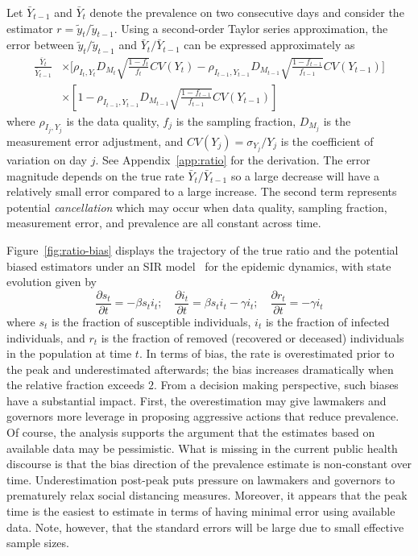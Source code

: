 \documentclass[12pt]{amsart}
\numberwithin{equation}{section}
\theoremstyle{plain}
\begin{document}
Let $\bar Y_{t-1}$ and $\bar Y_{t}$ denote the prevalence on two consecutive days and consider the estimator $r = \tilde y_t / \tilde y_{t-1}$.  Using a second-order Taylor series approximation, the error between ${\tilde y_t}/{\tilde y_{t-1}}$ and ${\bar Y_{t}}/{\bar Y_{t-1}}$ can be expressed approximately as
$$
\begin{aligned}
\frac{\bar Y_t}{\bar Y_{t-1}} &\times \bigg[ \rho_{I_t,Y_t} D_{M_t} \sqrt{\frac{1-f_t}{f_t}} CV (Y_t)  -\rho_{I_{t-1},Y_{t-1}} D_{M_{t-1}} \sqrt{\frac{1-f_{t-1}}{f_{t-1}}} CV (Y_{t-1}) \bigg] \\
&\times \left[ 1 - \rho_{I_{t-1},Y_{t-1}} D_{M_{t-1}} \sqrt{\frac{1-f_{t-1}}{f_{t-1}}} CV (Y_{t-1}) \right]
\end{aligned}
$$
where $\rho_{I_j, Y_j}$ is the data quality, $f_j$ is the sampling fraction, $D_{M_j}$ is the measurement error adjustment, and $CV(Y_j) = \sigma_{Y_j}/Y_j$ is the coefficient of variation on day $j$.  See Appendix~\ref{app:ratio} for the derivation. The error magnitude depends on the true rate $\bar Y_{t} / \bar Y_{t-1}$ so a large decrease will have a relatively small error compared to a large increase. The second term represents potential \emph{cancellation} which may occur when data quality, sampling fraction, measurement error, and prevalence are all constant across time.

Figure~\ref{fig:ratio-bias} displays the trajectory of the true ratio and the potential biased estimators under an SIR model~\citep{Pastor2001,Newman2002,Parshani2010} for the epidemic dynamics, with state evolution given by
\begin{equation}
\label{eq:sir}
\frac{\partial s_t}{\partial t} = - \beta s_t i_t; \quad
\frac{\partial i_t}{\partial t} = \beta s_t i_t - \gamma i_t; \quad
\frac{\partial r_t}{\partial t} = - \gamma i_t
\end{equation}
where $s_t$ is the fraction of susceptible individuals, $i_t$ is the fraction of infected individuals, and $r_t$ is the fraction of removed (recovered or deceased) individuals in the population at time $t$.  In terms of bias, the rate is overestimated prior to the peak and underestimated afterwards; the bias increases dramatically when the relative fraction exceeds $2$.  From a decision making perspective, such biases have a substantial impact.  First, the overestimation may give lawmakers and governors more leverage in proposing aggressive actions that reduce prevalence.  Of course, the analysis supports the argument that the estimates based on available data may be pessimistic. What is missing in the current public health discourse is that the bias direction of the prevalence estimate is non-constant over time.   Underestimation post-peak puts pressure on lawmakers and governors to prematurely relax social distancing measures.  Moreover, it appears that the peak time is the easiest to estimate in terms of having minimal error using available data.  Note, however, that the standard errors will be large due to small effective sample sizes.
\end{document}
